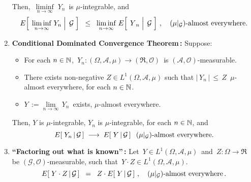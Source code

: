 \begin{theorem}
\begin{enumerate}
	Then,
	\,$\underset{n\rightarrow\infty}{\liminf}\;Y_{n}$\, is $\mu$-integrable, and
	\begin{equation*}
	E\!\left[\;\left.\underset{n\rightarrow\infty}{\liminf}\;Y_{n}\;\right\vert\;\mathcal{G}\;\right]
	\;\;\leq\;\;
	\underset{n\rightarrow\infty}{\liminf}\; E\!\left[\;\left.\overset{{\color{white}.}}{Y}_{n}\;\right\vert\;\mathcal{G}\;\right]\,,
	\quad
	\textnormal{$(\mu\vert_{\mathcal{G}})$-almost everywhere}.
	\end{equation*}
\item\label{ConditionalDominatedConvergence}
	\textbf{Conditional Dominated Convergence Theorem\,:}
	\vskip 0.0cm
	Suppose:
	\begin{itemize}
	\item
		For each $n\in\mathbb{N}$,
		\,$Y_{n} : (\Omega,\mathcal{A},\mu)\longrightarrow(\Re,\mathcal{O})$\,
		is $(\mathcal{A},\mathcal{O})$-measurable.
	\item
		There exists non-negative $Z \in L^{1}(\Omega,\mathcal{A},\mu)$ such that
		$\vert \, Y_{n} \, \vert \,\leq\, Z$\, $\mu$-almost everywhere, for each $n\in\mathbb{N}$.
	\item
		$Y \,:= \underset{n\rightarrow\infty}{\lim}\,Y_{n}$\, exists, $\mu$-almost everywhere.
	\end{itemize}
	Then, $Y$ is $\mu$-integrable, $Y_{n}$ is $\mu$-integrable, for each $n\in\mathbb{N}$, and
	\begin{equation*}
	E\!\left[\;Y_{n}\,\vert\,\mathcal{G}\,\right]
	\;\longrightarrow\;
	E\!\left[\;Y\,\vert\,\mathcal{G}\,\right]
	\;\;\textnormal{$(\mu\vert_{\mathcal{G}})$-almost everywhere}.
	\end{equation*}
\item\label{FactorOutWhatIsKnown}
	\textbf{``Factoring out what is known''\,:}
	\vskip 0.0cm
	Let \,$Y \in L^{1}(\Omega,\mathcal{A},\mu)$\, and \,$Z : \Omega \longrightarrow \Re$ be
	$(\mathcal{G},\mathcal{O})$-measurable, such that
	\,$Y \cdot Z \in L^{1}(\Omega,\mathcal{A},\mu)$.
	\begin{equation*}
	E\!\left[\;Y \cdot Z\,\vert\,\mathcal{G}\,\right]
	\;\; = \;\;
	Z \cdot E\!\left[\;Y\,\vert\,\mathcal{G}\,\right]\,,
	\quad
	\textnormal{$(\mu\vert_{\mathcal{G}})$-almost everywhere}\,.
	\end{equation*}
\end{enumerate}
\end{theorem}

\proof

